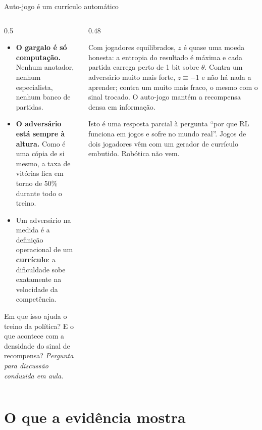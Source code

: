 \documentclass[aspectratio=169, 10pt]{beamer}
\newcommand{\paradiscussao}{\smallskip
  {\footnotesize\color{rlCinza}\itshape Pergunta para discussão conduzida em aula.}}
\begin{document}
\begin{frame}{Auto-jogo é um currículo automático}
  \footnotesize
  \begin{columns}[T]
    \begin{column}{0.5\textwidth}
      \begin{itemize}\setlength{\itemsep}{0.4em}
        \item \textbf{O gargalo é só computação.} Nenhum anotador, nenhum
              especialista, nenhum banco de partidas.
        \item \textbf{O adversário está sempre à altura.} Como é uma cópia de si
              mesmo, a taxa de vitórias fica em torno de 50\% durante todo o
              treino.
        \item Um adversário na medida é a definição operacional de um
              \textbf{currículo}: a dificuldade sobe exatamente na velocidade da
              competência.
      \end{itemize}
      \medskip
      \begin{quizbox}{}
        Em que isso ajuda o treino da política? E o que acontece com a densidade
        do sinal de recompensa?
        \paradiscussao
      \end{quizbox}
    \end{column}
    \begin{column}{0.48\textwidth}
      \pause
      \begin{respbox}
        Com jogadores equilibrados, $z$ é quase uma moeda honesta: a entropia do
        resultado é máxima e cada partida carrega perto de 1 bit sobre $\theta$.
        Contra um adversário muito mais forte, $z \equiv -1$ e não há nada a
        aprender; contra um muito mais fraco, o mesmo com o sinal trocado. O
        auto-jogo mantém a recompensa \alert{densa em informação}.
      \end{respbox}
      \begin{ideiabox}
        Isto é uma resposta parcial à pergunta ``por que RL funciona em jogos e
        sofre no mundo real''. Jogos de dois jogadores vêm com um gerador de
        currículo embutido. Robótica não vem.
      \end{ideiabox}
    \end{column}
  \end{columns}
\end{frame}

\section{O que a evidência mostra}
\end{document}
